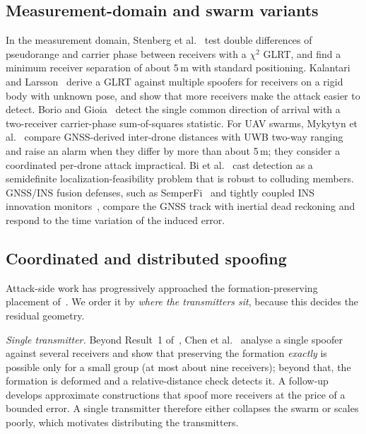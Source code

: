 \documentclass[conference]{IEEEtran}
\begin{document}
\subsection{Measurement-domain and swarm variants}
In the measurement domain, Stenberg et al.~\cite{stenberg2022multiple}
test double differences of pseudorange and carrier phase between
receivers with a $\chi^2$ GLRT, and find a minimum receiver separation
of about 5\,m with standard positioning. Kalantari and
Larsson~\cite{kalantari2020rigidbody} derive a GLRT against multiple
spoofers for receivers on a rigid body with unknown pose, and show that
more receivers make the attack easier to detect. Borio and
Gioia~\cite{borio2016sumofsquares} detect the single common direction of
arrival with a two-receiver carrier-phase sum-of-squares statistic. For
UAV swarms, Mykytyn et al.~\cite{mykytyn2023uwb} compare GNSS-derived
inter-drone distances with UWB two-way ranging and raise an alarm when
they differ by more than about 5\,m; they consider a coordinated
per-drone attack impractical.
Bi et al.~\cite{bi2024sdp} cast detection as a semidefinite
localization-feasibility problem that is robust to colluding members.
GNSS/INS fusion defenses, such as SemperFi~\cite{sathaye2022semperfi}
and tightly coupled INS innovation
monitors~\cite{tanil2018insmonitor,kujur2024insmonitor}, compare the
GNSS track with inertial dead reckoning and respond to the time
variation of the induced error.

\subsection{Coordinated and distributed spoofing}
Attack-side work has progressively approached the formation-preserving
placement of~\cite{tippenhauer2011requirements}. We order it by
\emph{where the transmitters sit}, because this decides the residual
geometry.

\emph{Single transmitter.} Beyond Result~1
of~\cite{tippenhauer2011requirements}, Chen et
al.~\cite{chen2024singlespoofer} analyse a single spoofer against several
receivers and show that preserving the formation \emph{exactly} is
possible only for a small group (at most about nine receivers); beyond
that, the formation is deformed and a relative-distance check detects
it. A follow-up~\cite{chen2025swarmspoofing} develops approximate
constructions that spoof more receivers at the price of a bounded error.
A single transmitter therefore either collapses the swarm or scales
poorly, which motivates distributing the transmitters.
\end{document}
